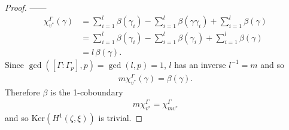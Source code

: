 \begin{proof}
------
\begin{align*}
	\chi_{v^*}^\Gamma(\gamma) 
	&=  \sum_{i = 1}^l\beta(\gamma_i) - \sum_{i = 1}^l \beta(\gamma\gamma_i) +\sum_{i = 1}^l \beta(\gamma)\\
	&=  \sum_{i = 1}^l\beta(\gamma_i) - \sum_{i = 1}^l \beta(\gamma_i) +\sum_{i = 1}^l \beta(\gamma) \\
	&=  l\, \beta(\gamma).
\end{align*}
Since $\gcd([\Gamma:\Gamma_p], p) = \gcd(l,p) = 1$, $l$ has an inverse $l^{-1} = m$ and so
\begin{align*}
	m\chi_{v^*}^\Gamma(\gamma) = \beta(\gamma).
\end{align*}
Therefore $\beta$ is the 1-coboundary
\begin{align}
  m\chi_{v^*}^\Gamma = \chi_{mv^*}^\Gamma
\end{align}
and so $\mathrm{Ker}\left(H^1(\zeta, \xi)\right)$ is trivial.
\end{proof}

